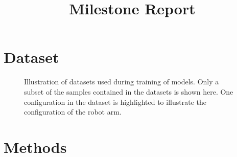 \documentclass[conference]{IEEEtran}
\begin{document}
\title{Milestone Report}

\author{
    \and
}

\maketitle

\section*{Dataset}

\begin{figure}[t]
    \centering
    \caption{Illustration of datasets used during training of models. Only a subset of the samples contained in the datasets is shown here. One configuration in the dataset is highlighted to illustrate the configuration of the robot arm.}
    \label{fig_sim}
\end{figure}


\section*{Methods}
\end{document}
